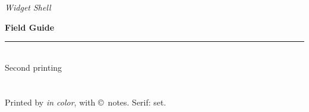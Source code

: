 \renewcommand{\rmdefault}{ptm} %
\newlength{\coverwidth}
\setlength{\coverwidth}{6cm}
\begin{titlepage}
  \vspace*{10mm}
  \begin{center}
    \begin{minipage}{\coverwidth}
      \begin{center}
        \rmfamily\mdseries\itshape\fontsize{20}{0}\selectfont
        Widget Shell\\
      \end{center}
    \end{minipage}
    \vfill
    \begin{minipage}{\coverwidth}
      \sffamily\bfseries
      Field Guide\/\\[2mm]
      \rule[3mm]{\textwidth}{1mm}\\
      \upshape\mdseries Second printing
    \end{minipage}
  \end{center}
  \thispagestyle{empty}
\end{titlepage}
\section*{\contentsname}
Printed by \hfill{\itshape in color}\/, with \copyright\ notes.
Serif: \renewcommand{\rmdefault}{ptm}set.
\kern-1pt\hfill\Hook
\renewenvironment{theindex}%
  {\begin{list}{}{}}%
  {\end{list}}

